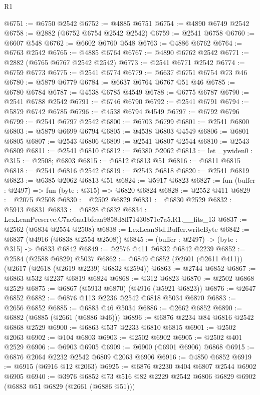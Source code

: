 \begin{lexlean}{R1}
\begin{coremodule}
@6751 := @6750 @2542
@6752 := @4885 @6751
@6754 := @4890 @6749 @2542
@6758 := @2882 (@6752 @6754 @2542 @2542)
@6759 := @2541 @6758
@6760 := @6607 @548
@6762 := @6602 @6760 @548
@6763 := @4886 @6762
@6764 := @6763 @2542
@6765 := @4885 @6764
@6767 := @4890 @6762 @2542
@6771 := @2882 (@6765 @6767 @2542 @2542)
@6773 := @2541 @6771 @2542
@6774 := @6759 @6773
@6775 := @2541 @6774
@6779 := @6637 @6751 @6754 @73 @46
@6780 := @5879 @6779
@6784 := @6637 @6764 @6767 @51 @46
@6785 := @6780 @6784
@6787 := @4538 @6785 @4549
@6788 := @6775 @6787
@6790 := @2541 @6788 @2542
@6791 := @6746 @6790
@6792 := @2541 @6791
@6794 := @5879 @6742 @6785
@6796 := @4538 @6794 @4549
@6797 := @6792 @6796
@6799 := @2541 @6797 @2542
@6800 := @6703 @6799
@6801 := @2541 @6800
@6803 := @5879 @6699 @6794
@6805 := @4538 @6803 @4549
@6806 := @6801 @6805
@6807 := @2543 @6806
@6809 := @2541 @6807 @2544
@6810 := @2543 @6809
@6811 := @2541 @6810
@6812 := @6380 @2062
@6813 := let _ywiden0 : @315 := @2508; @6803
@6815 := @6812 @6813 @51
@6816 := @6811 @6815
@6818 := @2541 @6816 @2542
@6819 := @2543 @6818
@6820 := @2541 @6819
@6823 := @6385 @2062 @6813 @51
@6824 := @5917 @6823
@6827 := fun (buffer : @2497) => fun (byte : @315) => @6820 @6824
@6828 := @2552 @411
@6829 := @2075 @2508
@6830 := @2502 @6829
@6831 := @6830 @2529
@6832 := @5913 @6831
@6833 := @6828 @6832
@6834 := LexLeanPreserve.C7ae6aa1bfcaa9858d8ff71430871e7a5.R1.__fits_13
@6837 := @2562 (@6834 @2554 @2508)
@6838 := LexLeanStd.Buffer.writeByte
@6842 := @6837 (@4916 (@6838 @2554 @2508))
@6845 := (buffer : @2497) -> (byte : @315) -> @6833 @6842
@6849 := @2576 @411 @6832 @6842 @2239
@6852 := @2584 (@2588 @6829) @5037
@6862 := @6849 @6852 (@2601 (@2611 @411)) (@2617 (@2618 (@2619 @2239) @6832 @2594))
@6863 := @2744 @6852
@6867 := @6863 @532 @2237 @6819 @6824
@6868 := @312 @6823
@6870 := @2502 @6868 @2529
@6875 := @6867 (@5913 @6870) (@4916 (@5921 @6823))
@6876 := @2647 @6852
@6882 := @6876 @113 @2236 @2542 @6818 @5034 @6870
@6883 := @2656 @6852
@6885 := @6883 @46 @5034
@6886 := @2662 @6852
@6890 := @6882 (@6885 (@2661 (@6886 @46)))
@6896 := @6876 @2234 @84 @6816 @2542 @6868 @2529
@6900 := @6863 @537 @2233 @6810 @6815
@6901 := @2502 @2063
@6902 := @104 @6803
@6903 := @2502 @6902
@6905 := @2502 @401 @2529
@6906 := @6903 @6905
@6909 := @6900 (@6901 @6906) @6868
@6915 := @6876 @2064 @2232 @2542 @6809 @2063 @6906
@6916 := @4850 @6852
@6919 := @6915 (@6916 @12 @2063)
@6925 := @6876 @2230 @404 @6807 @2544 @6902 @6905
@6940 := @3976
    @6852
    @73
    @516
    @82
    @2229
    @2542
    @6806
    @6829
    @6902
    (@6883 @51 @6829 (@2661 (@6886 @51)))

\end{coremodule}
\end{lexlean}
